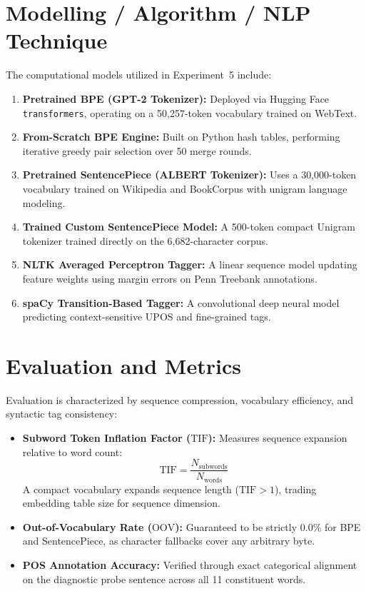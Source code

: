 \documentclass[12pt,a4paper]{report}
\begin{document}
\section{Modelling / Algorithm / NLP Technique}
The computational models utilized in Experiment~5 include:
\begin{enumerate}
    \item \textbf{Pretrained BPE (GPT-2 Tokenizer):} Deployed via Hugging Face \texttt{transformers}, operating on a 50,257-token vocabulary trained on WebText.
    \item \textbf{From-Scratch BPE Engine:} Built on Python hash tables, performing iterative greedy pair selection over 50 merge rounds.
    \item \textbf{Pretrained SentencePiece (ALBERT Tokenizer):} Uses a 30,000-token vocabulary trained on Wikipedia and BookCorpus with unigram language modeling.
    \item \textbf{Trained Custom SentencePiece Model:} A 500-token compact Unigram tokenizer trained directly on the 6,682-character corpus.
    \item \textbf{NLTK Averaged Perceptron Tagger:} A linear sequence model updating feature weights using margin errors on Penn Treebank annotations.
    \item \textbf{spaCy Transition-Based Tagger:} A convolutional deep neural model predicting context-sensitive UPOS and fine-grained tags.
\end{enumerate}

\section{Evaluation and Metrics}
Evaluation is characterized by sequence compression, vocabulary efficiency, and syntactic tag consistency:
\begin{itemize}
    \item \textbf{Subword Token Inflation Factor ($\text{TIF}$):} Measures sequence expansion relative to word count:
    \begin{equation}
        \text{TIF} = \frac{N_{\text{subwords}}}{N_{\text{words}}}
    \end{equation}
    A compact vocabulary expands sequence length ($\text{TIF} > 1$), trading embedding table size for sequence dimension.
    \item \textbf{Out-of-Vocabulary Rate ($\text{OOV}$):} Guaranteed to be strictly $0.0\%$ for BPE and SentencePiece, as character fallbacks cover any arbitrary byte.
    \item \textbf{POS Annotation Accuracy:} Verified through exact categorical alignment on the diagnostic probe sentence across all 11 constituent words.
\end{itemize}
\end{document}
